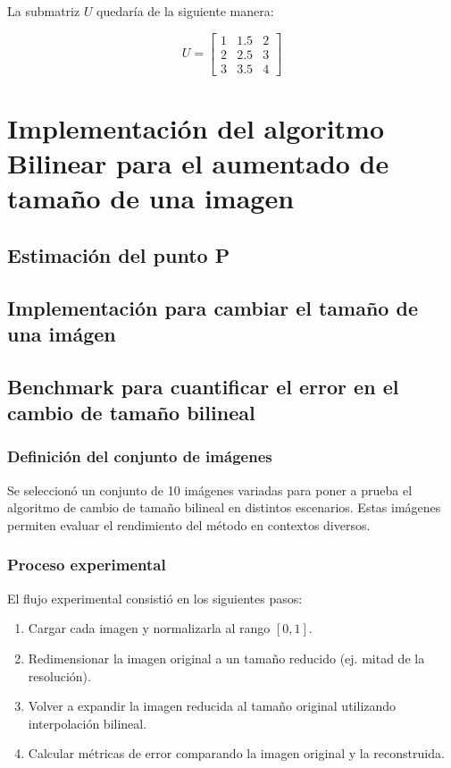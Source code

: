 \documentclass[12pt,a4paper]{article}
\begin{document}
La submatriz $U$ quedaría de la siguiente manera:

\[
U =
    \begin{bmatrix}
    1 & 1.5 & 2 \\
    2 & 2.5 & 3 \\
    3 & 3.5 & 4
    \end{bmatrix}
\]

\section{Implementación del algoritmo Bilinear para el aumentado de tamaño de una imagen}

\subsection{Estimación del punto P}

\subsection{Implementación para cambiar el tamaño de una imágen}

\subsection{Benchmark para cuantificar el error en el cambio de tamaño bilineal}

\subsubsection{Definición del conjunto de imágenes}
Se seleccionó un conjunto de 10 imágenes variadas para poner a prueba 
el algoritmo de cambio de tamaño bilineal en distintos escenarios. 
Estas imágenes permiten evaluar el rendimiento del método en contextos diversos.

\subsubsection{Proceso experimental}
El flujo experimental consistió en los siguientes pasos:
\begin{enumerate}
    \item Cargar cada imagen y normalizarla al rango $[0,1]$.
    \item Redimensionar la imagen original a un tamaño reducido (ej. mitad de la resolución).
    \item Volver a expandir la imagen reducida al tamaño original utilizando interpolación bilineal.
    \item Calcular métricas de error comparando la imagen original y la reconstruida.
\end{enumerate}
\end{document}
